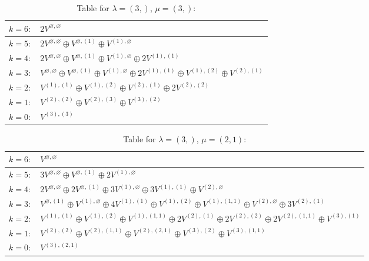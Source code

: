 \renewcommand{\arraystretch}{1.6} 
\begin{table}[H]
\centering
\caption{Table for $\lambda = (3,)$, $\mu = (3,)$:}
\begin{tabular}{|>{\centering\arraybackslash}p{15cm}|}
\hline
 $k = 6: \quad 2 V^{\varnothing, \varnothing} $ \\ \hline
 $k = 5: \quad 2 V^{\varnothing, \varnothing} \oplus V^{\varnothing, (1)} \oplus V^{(1), \varnothing} $ \\ \hline
 $k = 4: \quad 2 V^{\varnothing, \varnothing} \oplus V^{\varnothing, (1)} \oplus V^{(1), \varnothing} \oplus 2 V^{(1), (1)} $ \\ \hline
 $k = 3: \quad V^{\varnothing, \varnothing} \oplus V^{\varnothing, (1)} \oplus V^{(1), \varnothing} \oplus 2 V^{(1), (1)} \oplus V^{(1), (2)} \oplus V^{(2), (1)} $ \\ \hline
 $k = 2: \quad V^{(1), (1)} \oplus V^{(1), (2)} \oplus V^{(2), (1)} \oplus 2 V^{(2), (2)} $ \\ \hline
 $k = 1: \quad V^{(2), (2)} \oplus V^{(2), (3)} \oplus V^{(3), (2)} $ \\ \hline
 $k = 0: \quad V^{(3), (3)} $ \\ \hline
\end{tabular}
\end{table}

\renewcommand{\arraystretch}{1.6} 
\begin{table}[H]
\centering
\caption{Table for $\lambda = (3,)$, $\mu = (2, 1)$:}
\begin{tabular}{|>{\centering\arraybackslash}p{15cm}|}
\hline
 $k = 6: \quad V^{\varnothing, \varnothing} $ \\ \hline
 $k = 5: \quad 3 V^{\varnothing, \varnothing} \oplus V^{\varnothing, (1)} \oplus 2 V^{(1), \varnothing} $ \\ \hline
 $k = 4: \quad 2 V^{\varnothing, \varnothing} \oplus 2 V^{\varnothing, (1)} \oplus 3 V^{(1), \varnothing} \oplus 3 V^{(1), (1)} \oplus V^{(2), \varnothing} $ \\ \hline
 $k = 3: \quad V^{\varnothing, (1)} \oplus V^{(1), \varnothing} \oplus 4 V^{(1), (1)} \oplus V^{(1), (2)} \oplus V^{(1), (1, 1)} \oplus V^{(2), \varnothing} \oplus 3 V^{(2), (1)} $ \\ \hline
 $k = 2: \quad V^{(1), (1)} \oplus V^{(1), (2)} \oplus V^{(1), (1, 1)} \oplus 2 V^{(2), (1)} \oplus 2 V^{(2), (2)} \oplus 2 V^{(2), (1, 1)} \oplus V^{(3), (1)} $ \\ \hline
 $k = 1: \quad V^{(2), (2)} \oplus V^{(2), (1, 1)} \oplus V^{(2), (2, 1)} \oplus V^{(3), (2)} \oplus V^{(3), (1, 1)} $ \\ \hline
 $k = 0: \quad V^{(3), (2, 1)} $ \\ \hline
\end{tabular}
\end{table}

